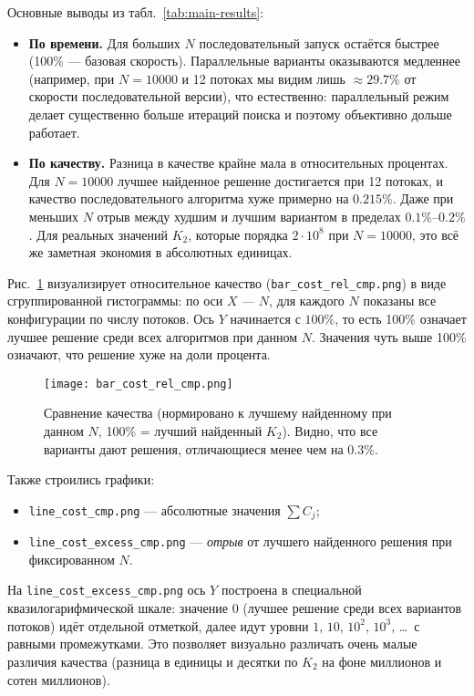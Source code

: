 \documentclass[a4paper,12pt]{article}
\begin{document}
Основные выводы из табл.~\ref{tab:main-results}:
\begin{itemize}
    \item \textbf{По времени.} Для больших $N$ последовательный запуск остаётся быстрее (100\% --- базовая скорость). Параллельные варианты оказываются медленнее (например, при $N=10000$ и 12 потоках мы видим лишь $\approx 29.7\%$ от скорости последовательной версии), что естественно: параллельный режим делает существенно больше итераций поиска и поэтому объективно дольше работает.
    \item \textbf{По качеству.} Разница в качестве крайне мала в относительных процентах. Для $N=10000$ лучшее найденное решение достигается при 12 потоках, и качество последовательного алгоритма хуже примерно на $0.215\%$. Даже при меньших $N$ отрыв между худшим и лучшим вариантом в пределах $0.1\%$--$0.2\%$. Для реальных значений $K_2$, которые порядка $2\cdot 10^8$ при $N=10000$, это всё же заметная экономия в абсолютных единицах.
\end{itemize}

Рис.~\ref{fig:bar_rel_cost} визуализирует относительное качество (\texttt{bar\_cost\_rel\_cmp.png}) в виде сгруппированной гистограммы: по оси $X$ --- $N$, для каждого $N$ показаны все конфигурации по числу потоков. Ось $Y$ начинается с $100\%$, то есть 100\% означает лучшее решение среди всех алгоритмов при данном $N$. Значения чуть выше 100\% означают, что решение хуже на доли процента.

\begin{figure}[h!]
    \centering
    \texttt{[image: bar\_cost\_rel\_cmp.png]}
    \caption{Сравнение качества (нормировано к лучшему найденному при данном $N$, 100\% = лучший найденный $K_2$). Видно, что все варианты дают решения, отличающиеся менее чем на 0.3\%.}
    \label{fig:bar_rel_cost}
\end{figure}

Также строились графики:
\begin{itemize}
    \item \texttt{line\_cost\_cmp.png} --- абсолютные значения $\sum C_j$;
    \item \texttt{line\_cost\_excess\_cmp.png} --- \emph{отрыв} от лучшего найденного решения при фиксированном $N$.
\end{itemize}
На \texttt{line\_cost\_excess\_cmp.png} ось $Y$ построена в специальной квазилогарифмической шкале: значение $0$ (лучшее решение среди всех вариантов потоков) идёт отдельной отметкой, далее идут уровни $1$, $10$, $10^2$, $10^3$, \dots\ с равными промежутками. Это позволяет визуально различать очень малые различия качества (разница в единицы и десятки по $K_2$ на фоне миллионов и сотен миллионов).
\end{document}
